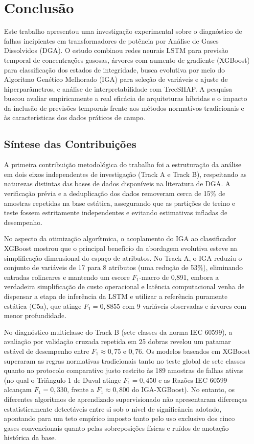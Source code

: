 \chapter{Conclusão}\label{cap:conclusao}

Este trabalho apresentou uma investigação experimental sobre o diagnóstico de falhas incipientes em transformadores de potência por Análise de Gases Dissolvidos (DGA). O estudo combinou redes neurais LSTM para previsão temporal de concentrações gasosas, árvores com aumento de gradiente (XGBoost) para classificação dos estados de integridade, busca evolutiva por meio do Algoritmo Genético Melhorado (IGA) para seleção de variáveis e ajuste de hiperparâmetros, e análise de interpretabilidade com TreeSHAP. A pesquisa buscou avaliar empiricamente a real eficácia de arquiteturas híbridas e o impacto da inclusão de previsões temporais frente aos métodos normativos tradicionais e às características dos dados práticos de campo.

\section{Síntese das Contribuições}\label{sec:sintese_contribuicoes}

A primeira contribuição metodológica do trabalho foi a estruturação da análise em dois eixos independentes de investigação (Track A e Track B), respeitando as naturezas distintas das bases de dados disponíveis na literatura de DGA. A verificação prévia e a deduplicação dos dados removeram cerca de 15\% de amostras repetidas na base estática, assegurando que as partições de treino e teste fossem estritamente independentes e evitando estimativas infladas de desempenho.

No aspecto da otimização algorítmica, o acoplamento do IGA ao classificador XGBoost mostrou que o principal benefício da abordagem evolutiva esteve na simplificação dimensional do espaço de atributos. No Track A, o IGA reduziu o conjunto de variáveis de 17 para 8 atributos (uma redução de 53\%), eliminando entradas colineares e mantendo um escore $F_1$-macro de 0,891, embora a verdadeira simplificação de custo operacional e latência computacional venha de dispensar a etapa de inferência da LSTM e utilizar a referência puramente estática (C5a), que atinge $F_1 = 0,8855$ com 9 variáveis observadas e árvores com menor profundidade.

No diagnóstico multiclasse do Track B (sete classes da norma IEC 60599), a avaliação por validação cruzada repetida em 25 dobras revelou um patamar estável de desempenho entre $F_1 \approx 0,75$ e $0,76$. Os modelos baseados em XGBoost superaram as regras normativas tradicionais tanto no teste global de sete classes quanto no protocolo comparativo justo restrito às 189 amostras de falhas ativas (no qual o Triângulo 1 de Duval atinge $F_1 = 0,450$ e as Razões IEC 60599 alcançam $F_1 = 0,330$, frente a $F_1 \approx 0,800$ do IGA-XGBoost). No entanto, os diferentes algoritmos de aprendizado supervisionado não apresentaram diferenças estatisticamente detectáveis entre si sob o nível de significância adotado, apontando para um teto empírico imposto tanto pelo uso exclusivo dos cinco gases convencionais quanto pelas sobreposições físicas e ruídos de anotação histórica da base.

